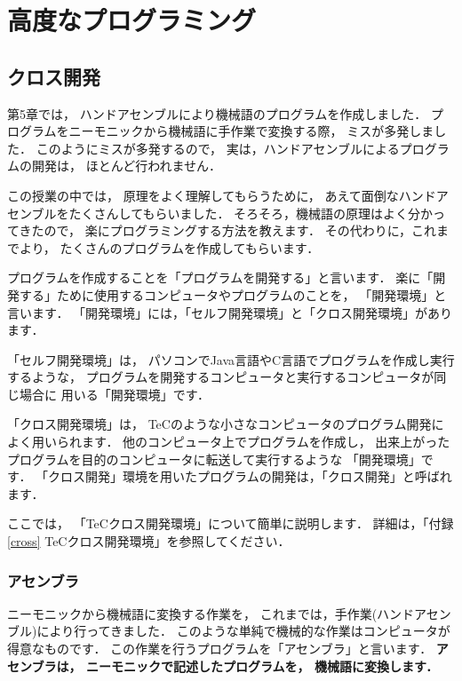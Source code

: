 \renewcommand{\myepsfbox}[1]{\epsfbox{chap6/#1}}

\chapter{高度なプログラミング}

\section{クロス開発}

第5章では，
ハンドアセンブルにより機械語のプログラムを作成しました．
プログラムをニーモニックから機械語に手作業で変換する際，
ミスが多発しました．
このようにミスが多発するので，
実は，ハンドアセンブルによるプログラムの開発は，
ほとんど行われません．

この授業の中では，
原理をよく理解してもらうために，
あえて面倒なハンドアセンブルをたくさんしてもらいました．
そろそろ，機械語の原理はよく分かってきたので，
楽にプログラミングする方法を教えます．
その代わりに，これまでより，
たくさんのプログラムを作成してもらいます．

プログラムを作成することを「プログラムを開発する」と言います．
楽に「開発する」ために使用するコンピュータやプログラムのことを，
「開発環境」と言います．
「開発環境」には，「セルフ開発環境」と「クロス開発環境」があります．

「セルフ開発環境」は，
パソコンでJava言語やC言語でプログラムを作成し実行するような，
プログラムを開発するコンピュータと実行するコンピュータが同じ場合に
用いる「開発環境」です．

「クロス開発環境」は，
TeCのような小さなコンピュータのプログラム開発によく用いられます．
他のコンピュータ上でプログラムを作成し，
出来上がったプログラムを目的のコンピュータに転送して実行するような
「開発環境」です．
「クロス開発」環境を用いたプログラムの開発は，「クロス開発」と呼ばれます．

ここでは，
「TeCクロス開発環境」について簡単に説明します．
詳細は，「付録\ref{cross} TeCクロス開発環境」を参照してください．


\subsection{アセンブラ}

ニーモニックから機械語に変換する作業を，
これまでは，手作業(ハンドアセンブル)により行ってきました．
このような単純で機械的な作業はコンピュータが得意なものです．
この作業を行うプログラムを「アセンブラ」と言います．
{\bf アセンブラは，
ニーモニックで記述したプログラムを，
機械語に変換します．}

